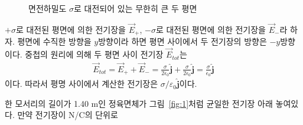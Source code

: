 \documentclass[tightenlines,floatfix,nofootinbib,superscriptaddress,fleqn]{revtex4-2}
\begin{document}
\begin{itemize}
\begin{figure}[htbp]
  \caption{면전하밀도 $\sigma$로 대전되어 있는 무한히 큰 두 평면}
  \label{fig:1-1}
\end{figure}
$+\sigma$로 대전된 평면에 의한 전기장을 $\vec{E}_+$,
$-\sigma$로 대전된 평면에 의한 전기장을 $\vec{E}_-$라 하자. 평면에 수직한 방향을 $y$방향이라
하면 평면 사이에서 두 전기장의 방향은 $-y$방향이다. 중첩의 원리에 의해 두 평면 사이 전기장 
$\vec{E}_{tot}$는
\begin{align}
  \vec{E}_{tot} = \vec{E}_++\vec{E}_-=\frac{\sigma}{2\epsilon_0}\hat{\bm{j}}
  +\frac{\sigma}{2\epsilon_0}\hat{\bm{j}}=\frac{\sigma}{\epsilon_0}\hat{\bm{j}}
\end{align}
이다. 따라서 평명 사이에서 계산한 전기장은 $\sigma/\varepsilon_0\hat{\bm{j}}$이다.
\end{itemize}


\vspace{0.5cm}
 한 모서리의 길이가 1.40 m인 정육면체가
그림~\ref{fig:1}처럼 균일한 전기장 아래 놓여있다. 만약 전기장이
N/C의 단위로 
\end{document}
